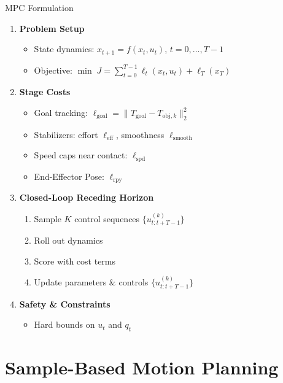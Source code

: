 \documentclass[10pt, aspectratio=169]{beamer}
\begin{document}
\begin{frame}{MPC Formulation}
\begin{enumerate}[<+->]
    \item \textbf{Problem Setup} 
        \begin{itemize}[<.->]
            \item State dynamics: $x_{t+1} = f(x_t, u_t)$, \quad $t=0,\dots,T-1$ 
            \item Objective: $\min \; J = \sum_{t=0}^{T-1} \ell_t(x_t,u_t) + \ell_T(x_T)$  
        \end{itemize}

    \item \textbf{Stage Costs}  
    \begin{itemize}[<.->]
      \item Goal tracking: $\ell_{\text{goal}} = \|T_{\text{goal}} - T_{\text{obj},k}\|_2^2$
      \item Stabilizers: effort $\ell_{\text{eff}}$, smoothness $\ell_{\text{smooth}}$
      \item Speed caps near contact: $\ell_{\text{spd}}$
      \item End-Effector Pose: $\ell_{\text{rpy}}$
    \end{itemize}

    \item \textbf{Closed-Loop Receding Horizon} 
        \begin{enumerate}[<.->]
            \item Sample $K$ control sequences $\{u_{t:t+T-1}^{(k)}\}$
            \item Roll out dynamics
            \item Score with cost terms
            \item Update parameters $\&$ controls $\{u_{t:t+T-1}^{(k)}\}$
        \end{enumerate}
        
    \item \textbf{Safety \& Constraints}  
    \begin{itemize}[<.->]
      \item Hard bounds on $u_t$ and $q_t$ 
    \end{itemize}
\end{enumerate}
\end{frame}

\section{Sample-Based Motion Planning}
\end{document}
